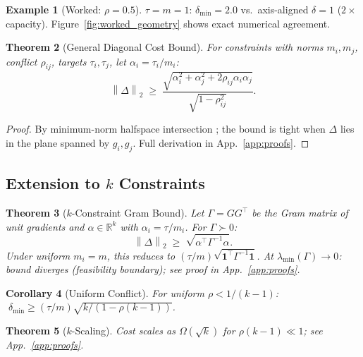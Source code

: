 \documentclass{article}
\theoremstyle{plain}
\newtheorem{theorem}{Theorem}[section]
\newtheorem{corollary}[theorem]{Corollary}
\theoremstyle{definition}
\newtheorem{example}[theorem]{Example}
\theoremstyle{remark}
\newcommand{\norm}[1]{\left\lVert #1 \right\rVert}
\newcommand{\appref}[1]{App.~\ref{#1}}
\begin{document}
\begin{example}[Worked: $\rho=0.5$]\label{ex:worked}
$\tau = m = 1$: $\delta_{\min} = 2.0$ vs.\ axis-aligned $\delta = 1$ ($2\times$ capacity). Figure~\ref{fig:worked_geometry} shows exact numerical agreement.
\end{example}


\begin{theorem}[General Diagonal Cost Bound]\label{thm:main_hetero}
For constraints with norms $m_i, m_j$, conflict $\rho_{ij}$, targets $\tau_i, \tau_j$, let $\alpha_i = \tau_i/m_i$:
\[
\norm{\Delta}_2 \;\ge\; \frac{\sqrt{\alpha_i^2 + \alpha_j^2 + 2\rho_{ij}\alpha_i\alpha_j}}{\sqrt{1-\rho_{ij}^2}}.
\]
\end{theorem}
\begin{proof}
By minimum-norm halfspace intersection \citep{boyd2004convex}; the bound is tight when $\Delta$ lies in the plane spanned by $g_i, g_j$. Full derivation in \appref{app:proofs}.
\end{proof}

\subsection{Extension to $k$ Constraints}

\begin{theorem}[$k$-Constraint Gram Bound]\label{thm:gram}
Let $\Gamma = GG^\top$ be the Gram matrix of unit gradients and $\alpha \in \mathbb{R}^k$ with $\alpha_i = \tau/m_i$. For $\Gamma \succ 0$:
\[
\norm{\Delta}_2 \;\ge\; \sqrt{\alpha^\top \Gamma^{-1} \alpha}.
\]
Under uniform $m_i = m$, this reduces to $(\tau/m)\sqrt{\mathbf{1}^\top \Gamma^{-1} \mathbf{1}}$. At $\lambda_{\min}(\Gamma) \to 0$: bound diverges (feasibility boundary); see proof in \appref{app:proofs}.
\end{theorem}

\begin{corollary}[Uniform Conflict]\label{cor:k_uniform}
For uniform $\rho < 1/(k{-}1)$: $\;\delta_{\min} \ge (\tau/m)\sqrt{k/(1{-}\rho(k{-}1))}$.
\end{corollary}

\begin{theorem}[$k$-Scaling]\label{thm:main_k}
Cost scales as $\Omega(\sqrt{k})$ for $\rho(k{-}1) \ll 1$; see \appref{app:proofs}.
\end{theorem}

\end{document}
